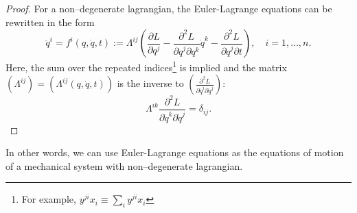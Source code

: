 \documentclass[english,fontsize=11pt,paper=a5,oneside]{scrbook}
\theoremstyle{definition}
\begin{document}
\begin{proof}
    For a non--degenerate lagrangian, the Euler-Lagrange equations can be rewritten in the form %
    \begin{equation}
        \ddot q^i = f^i(q,\dot q, t)
        := \Lambda^{ij}\left(\frac{\partial L}{\partial q^j} - \frac{\partial^2 L}{\partial \dot q^j \partial q^k} \dot q^k - \frac{\partial^2 L}{\partial\dot q^j \partial t}\right),
        \quad i=1,\ldots,n.
    \end{equation}
    Here, the sum over the repeated indices\footnote{For example, $y^{ji} x_i \equiv \sum_i y^{ji} x_i$} is implied and the matrix $\left(\Lambda^{ij}\right) = \left(\Lambda^{ij}(q, \dot q, t)\right)$ is the inverse to $\left(\frac{\partial^2 L}{\partial \dot q^i \partial \dot q^j}\right)$:
    \begin{equation}
        \Lambda^{ik} \frac{\partial^2 L}{\partial \dot q^k \partial \dot q^j} = \delta_{ij}.
    \end{equation}
\end{proof}

In other words, we can use Euler-Lagrange equations as the equations of motion of a mechanical system with non--degenerate lagrangian.
\end{document}
